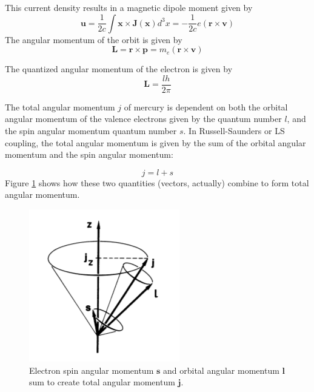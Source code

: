 \documentclass[twocolumn]{article}
\begin{document}
		This current density results in a magnetic dipole moment given by
		\begin{equation}
			\mathbf{u} = \frac{1}{2c}\int \mathbf{x} \times \mathbf{J(x)} d^3x = -\frac{1}{2c}e\left(\mathbf{r \times v}\right)
		\end{equation}
		The angular momentum of the orbit is given by
		\begin{equation}
			\mathbf{L} = \mathbf{r \times p} = m_e\left(\mathbf{r \times v}\right)
		\end{equation}
		
		The quantized angular momentum of the electron is given by 
		\begin{equation}
			\mathbf{L} = \frac{lh}{2\pi}
		\end{equation}
		
		The total angular momentum $j$ of mercury is dependent on both the orbital angular momentum of the valence electrons given by the quantum number $l$, and the spin angular momentum quantum number $s$.
		In Russell-Saunders or LS coupling, the total angular momentum is given by the sum of the orbital angular momentum and the spin angular momentum:
		
		\begin{equation}
			j = l + s
			\label{eq:TotalAngularP}
		\end{equation}
		Figure \ref{fig:TotalAngularMomentumDiagram} shows how these two quantities (vectors, actually) combine to form total angular momentum.
		
		\begin{figure}
			\centering
			\includegraphics[width=0.90\linewidth]{Images/TotalAngularMomentumDiagram}
			\caption{Electron spin angular momentum $\mathbf{s}$ and orbital angular momentum $\mathbf{l}$ sum to create total angular momentum $\mathbf{j}$.}
			\label{fig:TotalAngularMomentumDiagram}
		\end{figure}
\end{document}

